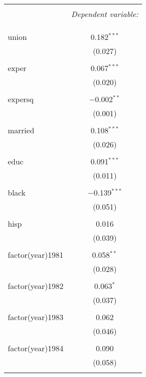 
\begin{table}[!htbp] \centering 
  \caption{} 
  \label{} 
\begin{tabular}{@{\extracolsep{5pt}}lc} 
\\[-1.8ex]\hline 
\hline \\[-1.8ex] 
 & \multicolumn{1}{c}{\textit{Dependent variable:}} \\ 
\cline{2-2} 
\\[-1.8ex] &   \\ 
\hline \\[-1.8ex] 
 union & 0.182$^{***}$ \\ 
  & (0.027) \\ 
  & \\ 
 exper & 0.067$^{***}$ \\ 
  & (0.020) \\ 
  & \\ 
 expersq & $-$0.002$^{**}$ \\ 
  & (0.001) \\ 
  & \\ 
 married & 0.108$^{***}$ \\ 
  & (0.026) \\ 
  & \\ 
 educ & 0.091$^{***}$ \\ 
  & (0.011) \\ 
  & \\ 
 black & $-$0.139$^{***}$ \\ 
  & (0.051) \\ 
  & \\ 
 hisp & 0.016 \\ 
  & (0.039) \\ 
  & \\ 
 factor(year)1981 & 0.058$^{**}$ \\ 
  & (0.028) \\ 
  & \\ 
 factor(year)1982 & 0.063$^{*}$ \\ 
  & (0.037) \\ 
  & \\ 
 factor(year)1983 & 0.062 \\ 
  & (0.046) \\ 
  & \\ 
 factor(year)1984 & 0.090 \\ 
  & (0.058) \\ 
  & \\ 

\end{tabular}
\end{table}

